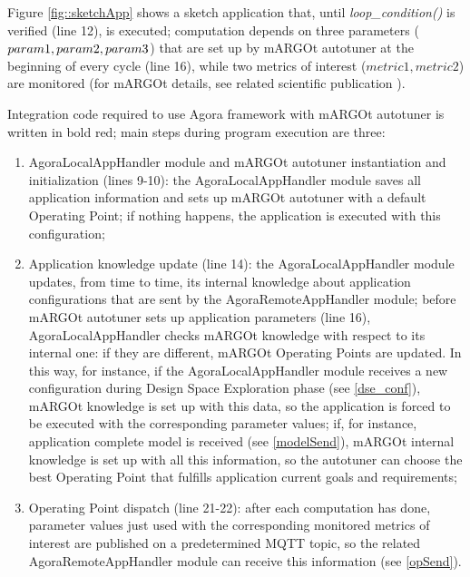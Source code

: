 Figure \ref{fig::sketchApp} shows a sketch application that, until \textit{loop\_con\-di\-tion()} is verified (line 12), is executed; computation depends on three parameters ($pa\-ram1, pa\-ram2, pa\-ram3$) that are set up by mARGOt autotuner at the beginning of every cycle (line 16), while two metrics of interest ($metric1, metric2$) are monitored (for mARGOt details, see related scientific publication \cite{gadioli2015application}).

Integration code required to use Agora framework with mARGOt autotuner is written in bold red; main steps during program execution are three:

\begin{enumerate}

    \item AgoraLocalAppHandler module and mARGOt autotuner instantiation and initialization (lines 9-10): the AgoraLocalAppHandler module saves all application information and sets up mARGOt autotuner with a default Operating Point; if nothing happens, the application is executed with this configuration;
    
    \item Application knowledge update (line 14): the AgoraLocalAppHandler module updates, from time to time, its internal knowledge about application configurations that are sent by the AgoraRemoteAppHandler module; before mARGOt autotuner sets up application parameters (line 16), AgoraLocalAppHandler checks mARGOt knowledge with respect to its internal one: if they are different, mARGOt Operating Points are updated. In this way, for instance, if the AgoraLocalAppHandler module receives a new configuration during Design Space Exploration phase (see \ref{dse_conf}), mARGOt knowledge is set up with this data, so the application is forced to be executed with the corresponding parameter values; if, for instance, application complete model is received (see \ref{modelSend}), mARGOt internal knowledge is set up with all this information, so the autotuner can choose the best Operating Point that fulfills application current goals and requirements;
    
    \item Operating Point dispatch (line 21-22): after each computation has done, parameter values just used with the corresponding monitored metrics of interest are published on a predetermined MQTT topic, so the related AgoraRemoteAppHandler module can receive this information (see \ref{opSend}).
    
\end{enumerate}

